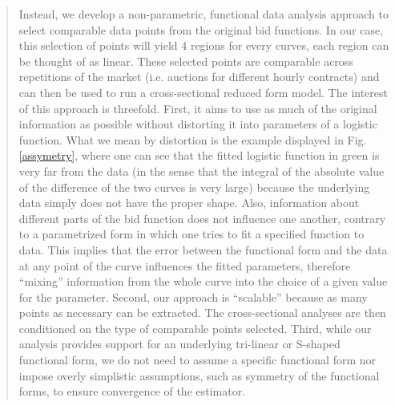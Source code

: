 \documentclass{article}
\begin{document}
\begin{itemize}
\begin{quote}
Instead, we develop a non-parametric, functional data analysis approach to select comparable data points from the original bid functions. In our case, this selection of points will yield 4 regions for every curves, each region can be thought of as linear. These selected points are comparable across repetitions of the market (i.e. auctions for different hourly contracts) and can then be used to run a cross-sectional reduced form model. The interest of this approach is threefold. First, it aims to use as much of the original information as possible without distorting it into parameters of a logistic function. What we mean by distortion is the example displayed in Fig. \ref{assymetry}, where one can see that the fitted logistic function in green is very far from the data (in the sense that the integral of the absolute value of the difference of the two curves is very large) because the underlying data simply does not have the proper shape. Also, information about different parts of the bid function does not influence one another, contrary to a parametrized form in which one tries to fit a specified function to data. This implies that the error between the functional form and the data at any point of the curve influences the fitted parameters, therefore ``mixing'' information from the whole curve into the choice of a given value for the parameter. Second, our approach is “scalable” because as many points as necessary can be extracted. The cross-sectional analyses are then conditioned on the type of comparable points selected. Third, while our analysis provides support for an underlying tri-linear or S-shaped functional form, we do not need to assume a specific functional form nor impose overly simplistic assumptions, such as symmetry of the functional forms, to ensure convergence of the estimator.\\
\end{quote}

\end{itemize}
\end{document}
